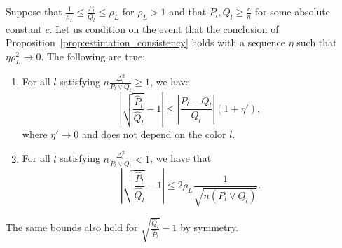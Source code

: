 \documentclass{article}
\begin{document}
\begin{lemma}
\label{lem:sqrt_ratio_pl_ql_minus_1}
Suppose that $\frac{1}{\rho_L} \leq \frac{P_l}{Q_l} \leq \rho_L$ for $\rho_L > 1$ and that $P_l, Q_l \geq \frac{c}{n}$ for some absolute constant $c$. Let us condition on the event that the 
conclusion of Proposition~\ref{prop:estimation_consistency} holds with a sequence $\eta$ such that $\eta \rho_L^2 \rightarrow 0$. The following are true:
\begin{enumerate}
\item 
For all $l$ satisfying  $n \frac{\Delta_l^2}{P_l \vee Q_l} \geq 1$, we have  
\[
\left| \sqrt{ \frac{\hat{P}_l }{\hat{Q}_l} } - 1 \right|
                    \leq \left| \frac{P_l - Q_l}{Q_l} \right| (1 + \eta'),
\]
where $\eta' \rightarrow 0$ and does not depend on the color $l$. 

\item
For all $l$ satisfying $n \frac{\Delta_l^2}{P_l \vee Q_l} < 1$, we have that
\[
\left| \sqrt{ \frac{\hat{P}_l}{\hat{Q}_l} } - 1 \right| \leq
 2 \rho_L \frac{1}{\sqrt{n  (P_l \vee Q_l) } }.
\]

\end{enumerate}
The same bounds also hold for $\sqrt{ \frac{\hat{Q}_l}{\hat{P}_l}} - 1$ by symmetry.
\end{lemma}
\end{document}
